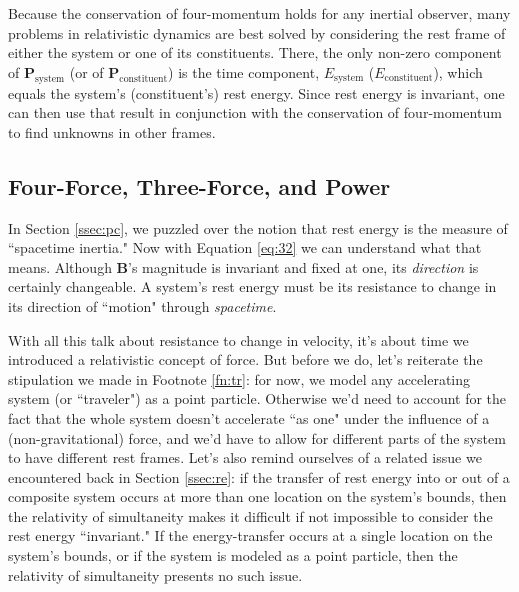 \documentclass[12pt]{article}
\renewcommand{\vv}[1]{\mathbf{#1}}
\begin{document}
Because the conservation of four-momentum holds for any inertial observer, many problems in relativistic dynamics are best solved by considering the rest frame of either the system or one of its constituents. There, the only non-zero component of $\vv P_{\mathrm{system}}$ (or of $\vv P_{\mathrm{constituent}}$) is the time component, $E_{\mathrm{system}}$ ($E_{\mathrm{constituent}}$), which equals the system's (constituent's) rest energy. Since rest energy is invariant, one can then use that result in conjunction with the conservation of four-momentum to find unknowns in other frames.


\subsection{Four-Force, Three-Force, and Power}\label{ssec:ff}

In Section \ref{ssec:pc}, we puzzled over the notion that rest energy is the measure of ``spacetime inertia." Now with Equation \ref{eq:32} we can understand what that means. Although $\vv B$'s magnitude is invariant and fixed at one, its \emph{direction} is certainly changeable. A system's rest energy must be its resistance to change in its direction of ``motion" through \emph{spacetime}.

With all this talk about resistance to change in velocity, it's about time we introduced a relativistic concept of force. But before we do, let's reiterate the stipulation we made in Footnote \ref{fn:tr}: for now, we model any accelerating system (or ``traveler") as a point particle. Otherwise we'd need to account for the fact that the whole system doesn't accelerate ``as one" under the influence of a (non-gravitational) force, and we'd have to allow for different parts of the system to have different rest frames. Let's also remind ourselves of a related issue we encountered back in Section \ref{ssec:re}: if the transfer of rest energy into or out of a composite system occurs at more than one location on the system's bounds, then the relativity of simultaneity makes it difficult if not impossible to consider the rest energy ``invariant." If the energy-transfer occurs at a single location on the system's bounds, or if the system is modeled as a point particle, then the relativity of simultaneity presents no such issue.
\end{document}
